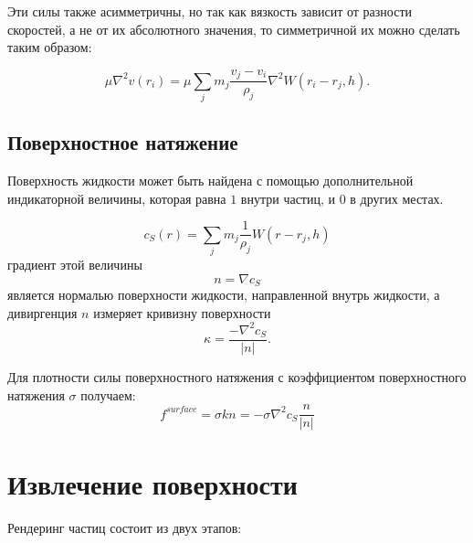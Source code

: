 Эти силы также асимметричны, но так как вязкость зависит от разности скоростей,
а не от их абсолютного значения, то симметричной их можно сделать таким образом:

\begin{equation}
	\mu \nabla^2 v(r_i) = \mu \sum_j m_j \frac{v_j - v_i}{\rho_j} \nabla^2 W(r_i - r_j, h).
\end{equation}

\subsection{Поверхностное натяжение}

Поверхность жидкости может быть найдена с помощью дополнительной индикаторной
величины, которая равна $1$ внутри частиц, и $0$ в других местах.

\begin{equation}
	c_S(r) = \sum_j m_j \frac{1}{\rho_j} W(r - r_j, h)
\end{equation}
градиент этой величины
\begin{equation}
	n = \nabla c_S
\end{equation}
является нормалью поверхности жидкости, направленной внутрь жидкости, а
дивиргенция $n$ измеряет кривизну поверхности
\begin{equation}
	\kappa = \frac{-\nabla^2 c_S}{|n|}.
\end{equation}

Для плотности силы поверхностного натяжения с коэффициентом поверхностного
натяжения $\sigma$ получаем:
\begin{equation}
	f^{surface} = \sigma k n = - \sigma \nabla^2 c_S \frac{n}{|n|}
\end{equation}

\section{Извлечение поверхности}

Рендеринг частиц состоит из двух этапов:

%
